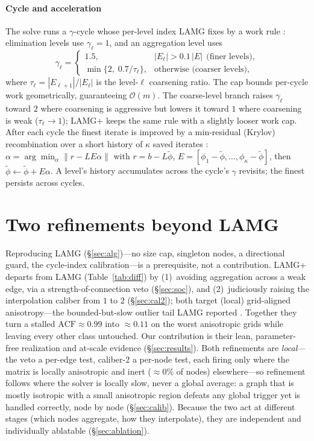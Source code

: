 \documentclass{siamart220329}
\newcommand{\Om}{\mathcal{O}(m)}
\newcommand{\acf}{\mathrm{ACF}}
\begin{document}
\paragraph{Cycle and acceleration} The solve runs a $\gamma$-cycle whose per-level index
LAMG fixes by a work rule \cite[Eq.~4.1]{lamg}: elimination levels use $\gamma_\ell=1$, and an
aggregation level uses
\begin{equation}\label{eq:gamma}
\gamma_\ell=\begin{cases}1.5, & |E_\ell|>0.1\,|E|\ \ \text{(finer levels)},\\[2pt]
\min\{2,\;0.7/\tau_\ell\}, & \text{otherwise (coarser levels)},\end{cases}
\end{equation}
where $\tau_\ell=|E_{\ell+1}|/|E_\ell|$ is the level-$\ell$ coarsening ratio. The cap bounds
per-cycle work geometrically, guaranteeing $\Om$. The coarse-level branch raises $\gamma_\ell$
toward $2$ where coarsening is aggressive but lowers it toward $1$ where coarsening is weak
($\tau_\ell\to1$); LAMG+ keeps the same rule with a slightly looser work cap.
After each cycle the finest iterate is improved by a min-residual
(Krylov) recombination over a short history of $\kappa$ saved iterates \cite[\S7.8.2]{guide}:
$\alpha=\arg\min_\alpha\|r-LE\alpha\|$ with $r = b - L \tilde\phi$, $E=[\phi_1-\tilde\phi,\dots,\phi_{\kappa}-\tilde\phi]$, then
$\tilde\phi\leftarrow \tilde\phi+E\alpha$. A level's history accumulates across the cycle's $\gamma$
revisits; the finest persists across cycles.

\section{Two refinements beyond LAMG}\label{sec:choices}
Reproducing LAMG (\S\ref{sec:alg})---no size cap, singleton nodes, a directional guard, the
cycle-index calibration---is a prerequisite, not a contribution. LAMG+ departs
from LAMG (Table~\ref{tab:diff}) by (1)~avoiding aggregation across a weak edge, via a
strength-of-connection veto (\S\ref{sec:soc}), and (2)~judiciously raising the interpolation caliber
from $1$ to $2$ (\S\ref{sec:cal2}); both target (local) grid-aligned anisotropy---the bounded-but-slow
outlier tail LAMG reported \cite[\S\S5.2,\,6.1]{lamg}. Together they turn a stalled
$\acf\approx0.99$ into $\approx0.11$ on the worst anisotropic grids while leaving every other class
untouched. Our contribution is their lean, parameter-free realization and
at-scale evidence (\S\ref{sec:results}). Both refinements are \emph{local}---the veto a per-edge
test, caliber-2 a per-node test, each firing only where the matrix is locally anisotropic and inert
($\approx\!0\%$ of nodes) elsewhere---so refinement follows where the solver is locally slow, never a
global average: a graph that is mostly isotropic with a small anisotropic region defeats any global
trigger yet is handled correctly, node by node (\S\ref{sec:calib}). Because the two act at different
stages (which nodes aggregate, how they interpolate), they are independent and individually
ablatable (\S\ref{sec:ablation}).
\end{document}

